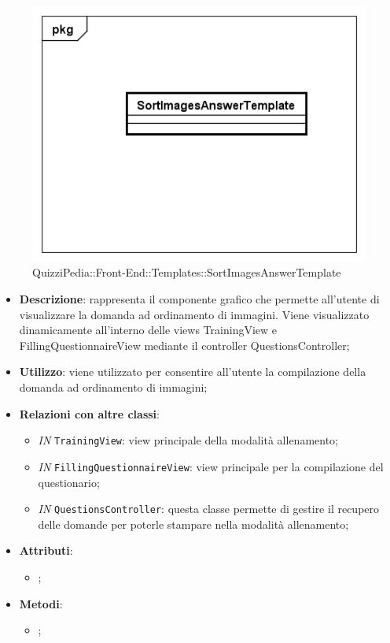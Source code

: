 		\begin{figure}[ht]
			\centering
			\includegraphics[scale=0.5,keepaspectratio]{UML/Classi/Front-End/QuizziPedia_Front-end_Templates_SortImagesAnswerTemplate.png}
			\caption{QuizziPedia::Front-End::Templates::SortImagesAnswerTemplate}
		\end{figure} \FloatBarrier
		
		\begin{itemize}
			\item \textbf{Descrizione}: rappresenta il componente grafico che permette all'utente di visualizzare la domanda ad ordinamento di immagini. Viene visualizzato dinamicamente all'interno delle views TrainingView e FillingQuestionnaireView mediante il controller QuestionsController;
			\item \textbf{Utilizzo}: viene utilizzato per consentire all'utente la compilazione della domanda ad ordinamento di immagini;
			\item \textbf{Relazioni con altre classi}: 
			\begin{itemize}
				\item \textit{IN} \texttt{TrainingView}: view principale della modalità allenamento; 
				\item \textit{IN} \texttt{FillingQuestionnaireView}: view principale per la compilazione del questionario;
				\item \textit{IN} \texttt{QuestionsController}: questa classe permette di gestire il recupero delle domande per poterle stampare nella modalità allenamento;
			\end{itemize}
			\item \textbf{Attributi}: 
			\begin{itemize}
				\item ;
			\end{itemize}
			\item \textbf{Metodi}: 
			\begin{itemize}
				\item ;
			\end{itemize}
		\end{itemize}
		
